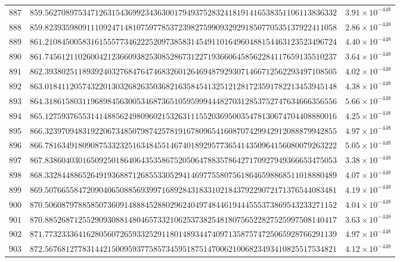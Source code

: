 \documentclass[12pt,reqno]{amsart}
\theoremstyle{remark}
\begin{document}
\begin{longtable}{clc}
$887$ & $859.5627089753471263154369923436300179493752832418191416538351106113836332$ & $3.91\times 10^{-448}$ \\
$888$ & $859.8239359809111092471481075977853723982759909329291850770535137922411058$ & $2.86\times 10^{-448}$ \\
$889$ & $861.2108450058316155577346222520973858314549110164960488154463123523496724$ & $4.40\times 10^{-448}$ \\
$890$ & $861.7456121102600421236609382530852867312271936606458562284117659135510237$ & $3.64\times 10^{-448}$ \\
$891$ & $862.3938025118939240327684764746832601264694879293071466712562293497108505$ & $4.02\times 10^{-448}$ \\
$892$ & $863.0184112057432201303268263503682163584541325121281723591782213453945148$ & $4.38\times 10^{-448}$ \\
$893$ & $864.3186158031196898456300534687365105959994448270312853752747634666356556$ & $5.66\times 10^{-448}$ \\
$894$ & $865.1275937655314148856249809602153263111552036950035478130674704408880016$ & $4.25\times 10^{-448}$ \\
$895$ & $866.3239709483192206734850798742578191678096541608707429942912088879942855$ & $4.97\times 10^{-448}$ \\
$896$ & $866.7816349180908753323251634845514674018929577365414350964156080079263222$ & $5.05\times 10^{-448}$ \\
$897$ & $867.8386040301650925018640643535867520506478835786427170927949366653475053$ & $3.38\times 10^{-448}$ \\
$898$ & $868.3328448865264919368871268553305294146977558075618646598868511018880489$ & $4.07\times 10^{-448}$ \\
$899$ & $869.5076655847209040650885693997168928431833102184379229072171376544083481$ & $4.19\times 10^{-448}$ \\
$900$ & $870.5060879788585073609148884528802962404974844619444555373869543233271152$ & $4.04\times 10^{-448}$ \\
$901$ & $870.8852687125529093088148046573321062537382548180756522827525997508140417$ & $3.63\times 10^{-448}$ \\
$902$ & $871.7732333641628056072659332529118014893447409713587574725065928766291139$ & $4.97\times 10^{-448}$ \\
$903$ & $872.5676812778314421500959377585734595187514700621006823493410825517534821$ & $4.12\times 10^{-448}$ \\

\end{longtable}
\end{document}
